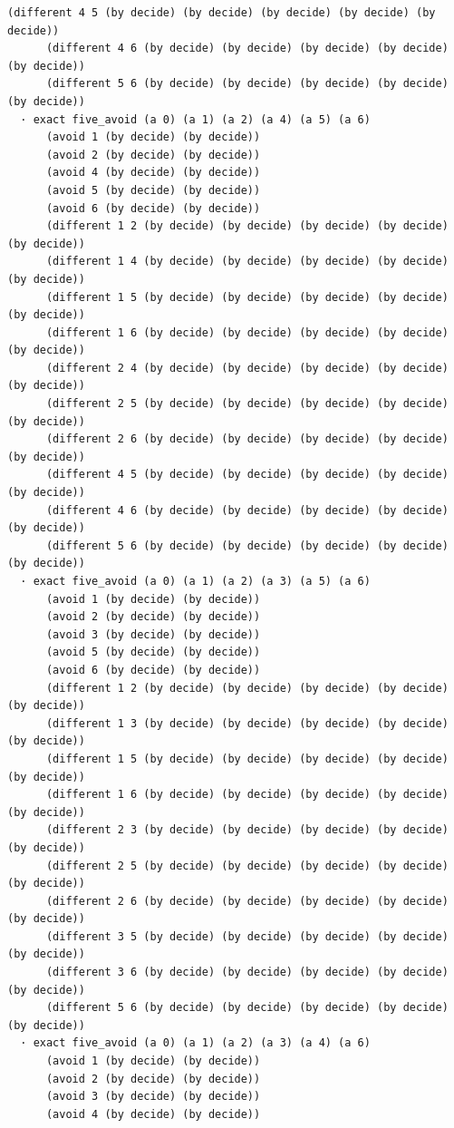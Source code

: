 \documentclass[11pt,a4paper]{article}
\begin{document}
\begin{Verbatim}[breaklines,breakanywhere,fontsize=\footnotesize]
      (different 4 5 (by decide) (by decide) (by decide) (by decide) (by decide))
      (different 4 6 (by decide) (by decide) (by decide) (by decide) (by decide))
      (different 5 6 (by decide) (by decide) (by decide) (by decide) (by decide))
  · exact five_avoid (a 0) (a 1) (a 2) (a 4) (a 5) (a 6)
      (avoid 1 (by decide) (by decide))
      (avoid 2 (by decide) (by decide))
      (avoid 4 (by decide) (by decide))
      (avoid 5 (by decide) (by decide))
      (avoid 6 (by decide) (by decide))
      (different 1 2 (by decide) (by decide) (by decide) (by decide) (by decide))
      (different 1 4 (by decide) (by decide) (by decide) (by decide) (by decide))
      (different 1 5 (by decide) (by decide) (by decide) (by decide) (by decide))
      (different 1 6 (by decide) (by decide) (by decide) (by decide) (by decide))
      (different 2 4 (by decide) (by decide) (by decide) (by decide) (by decide))
      (different 2 5 (by decide) (by decide) (by decide) (by decide) (by decide))
      (different 2 6 (by decide) (by decide) (by decide) (by decide) (by decide))
      (different 4 5 (by decide) (by decide) (by decide) (by decide) (by decide))
      (different 4 6 (by decide) (by decide) (by decide) (by decide) (by decide))
      (different 5 6 (by decide) (by decide) (by decide) (by decide) (by decide))
  · exact five_avoid (a 0) (a 1) (a 2) (a 3) (a 5) (a 6)
      (avoid 1 (by decide) (by decide))
      (avoid 2 (by decide) (by decide))
      (avoid 3 (by decide) (by decide))
      (avoid 5 (by decide) (by decide))
      (avoid 6 (by decide) (by decide))
      (different 1 2 (by decide) (by decide) (by decide) (by decide) (by decide))
      (different 1 3 (by decide) (by decide) (by decide) (by decide) (by decide))
      (different 1 5 (by decide) (by decide) (by decide) (by decide) (by decide))
      (different 1 6 (by decide) (by decide) (by decide) (by decide) (by decide))
      (different 2 3 (by decide) (by decide) (by decide) (by decide) (by decide))
      (different 2 5 (by decide) (by decide) (by decide) (by decide) (by decide))
      (different 2 6 (by decide) (by decide) (by decide) (by decide) (by decide))
      (different 3 5 (by decide) (by decide) (by decide) (by decide) (by decide))
      (different 3 6 (by decide) (by decide) (by decide) (by decide) (by decide))
      (different 5 6 (by decide) (by decide) (by decide) (by decide) (by decide))
  · exact five_avoid (a 0) (a 1) (a 2) (a 3) (a 4) (a 6)
      (avoid 1 (by decide) (by decide))
      (avoid 2 (by decide) (by decide))
      (avoid 3 (by decide) (by decide))
      (avoid 4 (by decide) (by decide))

\end{Verbatim}
\end{document}
